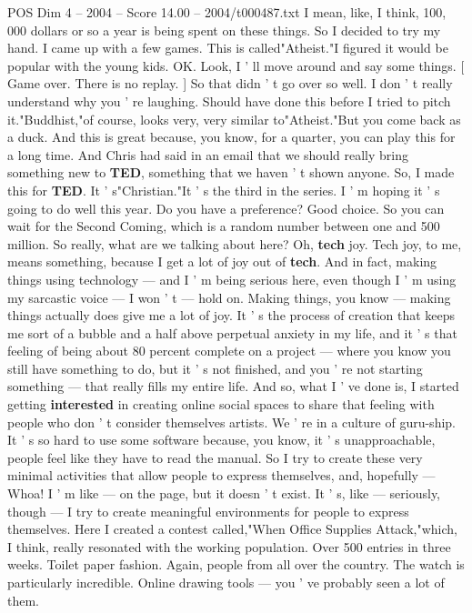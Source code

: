 \begin{textsample}{POS Dim 4 – 2004 – Score 14.00 – 2004/t000487.txt}
I mean, like, I think, 100, 000 dollars or so a year is being spent on these things.
So I decided to try my hand.
I came up with a few games.
This is called"Atheist."I figured it would be popular with the young kids.
OK.
Look, I ' ll move around and say some things. [ Game over.
There is no replay. ] So that didn ' t go over so well.
I don ' t really understand why you ' re laughing.
Should have done this before I tried to pitch it."Buddhist,"of course, looks very, very similar to"Atheist."But you come back as a duck.
And this is great because, you know, for a quarter, you can play this for a long time.
And Chris had said in an email that we should really bring something new to \textbf{TED}, something that we haven ' t shown anyone.
So, I made this for \textbf{TED}.
It ' s"Christian."It ' s the third in the series.
I ' m hoping it ' s going to do well this year.
Do you have a preference?
Good choice.
So you can wait for the Second Coming, which is a random number between one and 500 million.
So really, what are we talking about here?
Oh, \textbf{tech} joy.
Tech joy, to me, means something, because I get a lot of joy out of \textbf{tech}.
And in fact, making things using technology — and I ' m being serious here, even though I ' m using my sarcastic voice — I won ' t — hold on.
Making things, you know — making things actually does give me a lot of joy.
It ' s the process of creation that keeps me sort of a bubble and a half above perpetual anxiety in my life, and it ' s that feeling of being about 80 percent complete on a project — where you know you still have something to do, but it ' s not finished, and you ' re not starting something — that really fills my entire life.
And so, what I ' ve done is, I started getting \textbf{interested} in creating online social spaces to share that feeling with people who don ' t consider themselves artists.
We ' re in a culture of guru-ship.
It ' s so hard to use some software because, you know, it ' s unapproachable, people feel like they have to read the manual.
So I try to create these very minimal activities that allow people to express themselves, and, hopefully — Whoa!
I ' m like — on the page, but it doesn ' t exist.
It ' s, like — seriously, though — I try to create meaningful environments for people to express themselves.
Here I created a contest called,"When Office Supplies Attack,"which, I think, really resonated with the working population.
Over 500 entries in three weeks.
Toilet paper fashion.
Again, people from all over the country.
The watch is particularly incredible.
Online drawing tools — you ' ve probably seen a lot of them.

\end{textsample}
